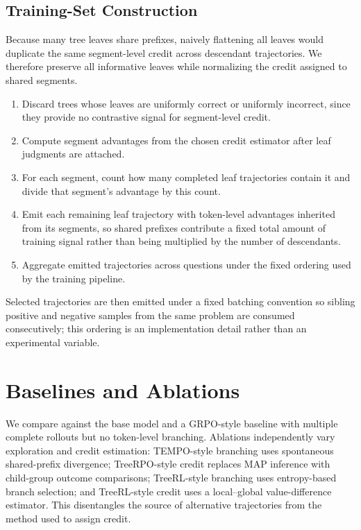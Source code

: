 \documentclass{article}
\begin{document}
\subsection{Training-Set Construction}
Because many tree leaves share prefixes, naively flattening all leaves would duplicate the same segment-level credit across descendant trajectories. We therefore preserve all informative leaves while normalizing the credit assigned to shared segments.
\begin{enumerate}
    \item Discard trees whose leaves are uniformly correct or uniformly incorrect, since they provide no contrastive signal for segment-level credit.
    \item Compute segment advantages from the chosen credit estimator after leaf judgments are attached.
    \item For each segment, count how many completed leaf trajectories contain it and divide that segment's advantage by this count.
    \item Emit each remaining leaf trajectory with token-level advantages inherited from its segments, so shared prefixes contribute a fixed total amount of training signal rather than being multiplied by the number of descendants.
    \item Aggregate emitted trajectories across questions under the fixed ordering used by the training pipeline.
\end{enumerate}

Selected trajectories are then emitted under a fixed batching convention so sibling positive and negative samples from the same problem are consumed consecutively; this ordering is an implementation detail rather than an experimental variable.

\section{Baselines and Ablations}
We compare against the base model and a GRPO-style baseline with multiple complete rollouts but no token-level branching. Ablations independently vary exploration and credit estimation: TEMPO-style branching uses spontaneous shared-prefix divergence; TreeRPO-style credit replaces MAP inference with child-group outcome comparisons; TreeRL-style branching uses entropy-based branch selection; and TreeRL-style credit uses a local--global value-difference estimator. This disentangles the source of alternative trajectories from the method used to assign credit.
\end{document}
